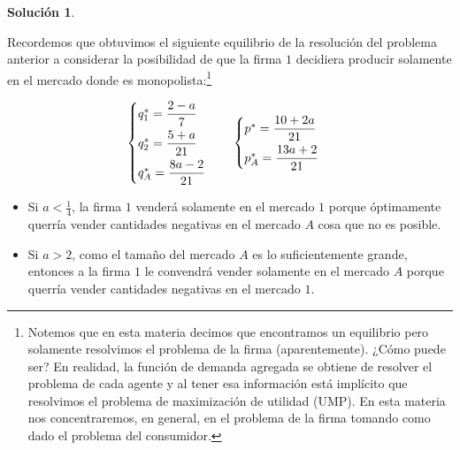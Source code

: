 \documentclass[a4paper, 11pt]{article}
\theoremstyle{definition}
\newtheorem{solucion}{Soluci\'on}
\begin{document}
\begin{solucion}
\begin{enumerate}[label=(\alph*)]
\begin{enumerate}[label=\roman*.]
 Recordemos que obtuvimos el siguiente equilibrio de la resolución del problema anterior a considerar la posibilidad de que la firma $1$ decidiera producir solamente en el mercado donde es monopolista:\footnote{Notemos que en esta materia decimos que encontramos un equilibrio pero solamente resolvimos el problema de la firma (aparentemente). ¿Cómo puede ser?  En realidad, la función de demanda agregada se obtiene de resolver el  problema de cada agente y al tener esa información está implícito que resolvimos el problema de maximización de utilidad (UMP). En esta materia nos concentraremos, en general, en el problema de la firma tomando como dado el problema del consumidor.}
 
 \vspace*{-18pt}
 
 \begin{align*}
     \begin{cases} q_1^* =\dfrac{2-a}{7} \vspace{4pt}\\ q_2^* =\dfrac{5+a}{21} \vspace{4pt}\\  q_A^*=\dfrac{8a-2}{21} \end{cases} \quad \begin{cases}  p^* =\dfrac{10+2a}{21} \vspace{4pt}\\ p_A^*=\dfrac{13a+2}{21} \end{cases} 
 \end{align*}
 
 \vspace{4pt}
 \begin{itemize}
\item Si $a<\frac{1}{4}$, la firma $1$ venderá solamente en el mercado $1$ porque óptimamente querría vender cantidades negativas en el mercado $A$ cosa que no es posible. %
 \item Si $a>2$, como el tamaño del mercado $A$ es lo suficientemente grande, entonces a la firma $1$ le convendrá vender solamente en el mercado $A$ porque querría vender cantidades negativas en el mercado $1$. %
 \end{itemize}
 

\end{enumerate}
\end{enumerate}
\end{solucion}
\end{document}
